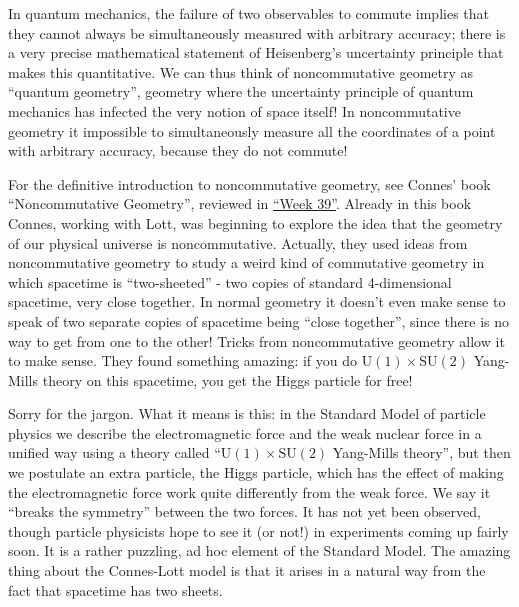 \documentclass{article}
\begin{document}
In quantum mechanics, the failure of two observables to commute implies
that they cannot always be simultaneously measured with arbitrary
accuracy; there is a very precise mathematical statement of Heisenberg's
uncertainty principle that makes this quantitative. We can thus think of
noncommutative geometry as ``quantum geometry'', geometry where the
uncertainty principle of quantum mechanics has infected the very notion
of space itself! In noncommutative geometry it impossible to
simultaneously measure all the coordinates of a point with arbitrary
accuracy, because they do not commute!

For the definitive introduction to noncommutative geometry, see Connes'
book ``Noncommutative Geometry'', reviewed in
\protect\hyperlink{week39}{``Week 39''}. Already in this book Connes,
working with Lott, was beginning to explore the idea that the geometry
of our physical universe is noncommutative. Actually, they used ideas
from noncommutative geometry to study a weird kind of commutative
geometry in which spacetime is ``two-sheeted'' - two copies of standard
4-dimensional spacetime, very close together. In normal geometry it
doesn't even make sense to speak of two separate copies of spacetime
being ``close together'', since there is no way to get from one to the
other! Tricks from noncommutative geometry allow it to make sense. They
found something amazing: if you do
\(\mathrm{U}(1)\times \mathrm{SU}(2)\) Yang-Mills theory on this
spacetime, you get the Higgs particle for free!

Sorry for the jargon. What it means is this: in the Standard Model of
particle physics we describe the electromagnetic force and the weak
nuclear force in a unified way using a theory called
``\(\mathrm{U}(1)\times \mathrm{SU}(2)\) Yang-Mills theory'', but then
we postulate an extra particle, the Higgs particle, which has the effect
of making the electromagnetic force work quite differently from the weak
force. We say it ``breaks the symmetry'' between the two forces. It has
not yet been observed, though particle physicists hope to see it (or
not!) in experiments coming up fairly soon. It is a rather puzzling, ad
hoc element of the Standard Model. The amazing thing about the
Connes-Lott model is that it arises in a natural way from the fact that
spacetime has two sheets.
\end{document}
